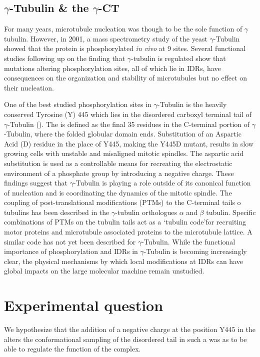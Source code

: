\subsection{$\gamma$-Tubulin \& the $\gamma$-CT}

For many years, microtubule nucleation was though to be the sole function of $\gamma$ tubulin. However, in 2001, a mass spectrometry study of the yeast $\gamma$-Tubulin showed that the protein is phosphorylated {\it in vivo} at 9 sites.  Several functional studies following up on the finding that $\gamma$-tubulin is regulated show that mutations altering phosphorylation sites, all of which lie in IDRs, have consequences on the organization and stability of microtubules but no effect on their nucleation.  

One of the best studied phosphorylation sites in $\gamma$-Tubulin is the heavily conserved Tyrosine (Y) 445 which lies in the disordered carboxyl terminal tail of $\gamma$-Tubulin (\gct).  The \gct{} is defined as the final 35 residues in the C-terminal portion of $\gamma$-Tubulin, where the folded globular domain ends. Substitution of an Aspartic Acid (D) residue in the place of Y445, making the Y445D mutant, results in slow growing cells with unstable and misaligned mitotic spindles. The aspartic acid substitution is used as a controllable means for recreating the electrostatic environment of a phosphate group by introducing a negative charge. These findings suggest that $\gamma$-Tubulin is playing a role outside of its canonical function of nucleation and is coordinating the dynamics of the mitotic spindle. The coupling of post-translational modifications (PTMs) to the C-terminal tails o tubulins has been described in the $\gamma$-tubulin orthologues $\alpha$ and $\beta$ tubulin. Specific combinations of PTMs on the tubulin tails act as a \lq tubulin code\rq for recruiting motor proteins and microtubule associated proteins to the microtubule lattice. A similar code has not yet been described for $\gamma$-Tubulin.  While the functional importance of phosphorylation and IDRs in $\gamma$-Tubulin is becoming increasingly clear, the physical mechanisms by which local modifications at IDRs can have global impacts on the large molecular machine remain unstudied. 
 
 \section{Experimental question}
 
 We hypothesize that the addition of a negative charge at the position Y445 in the \gct{} alters the conformational sampling of the disordered tail in such a was as to be able to regulate the function of the complex.  
 
